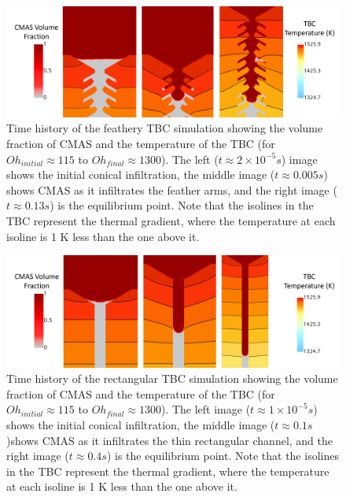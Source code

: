 \documentclass[%
 aip,
 amsmath,amssymb,
 reprint,%
floatfix]{revtex4-1}
\begin{document}
\begin{figure}
    \centering
    \includegraphics[width=\linewidth]{Figures/featheryTimeHistory.png}
    \caption{Time history of the feathery TBC simulation showing the volume fraction of CMAS and the temperature of the TBC (for $Oh_{initial} \approx 115$ to $Oh_{final} \approx 1300$). The left ($t \approx 2\times 10^{-5}s$) image shows the initial conical infiltration, the middle image ($t\approx 0.005 s$) shows CMAS as it infiltrates the feather arms, and the right image ($t \approx 0.13 s$) is the equilibrium point. Note that the isolines in the TBC represent the thermal gradient, where the temperature at each isoline is 1 K less than the one above it.}
    \label{fig:feathery_timehistory}
\end{figure}

\begin{figure}
    \centering
    \includegraphics[width=\linewidth]{Figures/rect_timeHistory.png}
    \caption{Time history of the rectangular TBC simulation showing the volume fraction of CMAS and the temperature of the TBC (for $Oh_{initial} \approx 115$ to $Oh_{final} \approx 1300$). The left image ($t \approx 1\times 10^{-5}s$) shows the initial conical infiltration, the middle image ($t \approx 0.1 s$)shows CMAS as it infiltrates the thin rectangular channel, and the right image ($t \approx 0.4 s$) is the equilibrium point. Note that the isolines in the TBC represent the thermal gradient, where the temperature at each isoline is 1 K less than the one above it.}
    \label{fig:rect_timehistory}
\end{figure}
\end{document}
